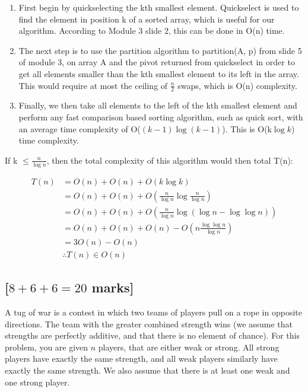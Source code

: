 \documentclass[12pt]{article}
\begin{document}
\begin{enumerate}
  \item First begin by quickselecting the kth smallest element. Quickselect is used to find the element in position k of a sorted array, which is useful for our algorithm. According to Module 3 slide 2, this can be done in O(n) time.
  \item The next step is to use the partition algorithm to partition(A, p) from slide 5 of module 3, on array A and the pivot returned from quickselect in order to get all elements smaller than the kth smallest element to its left in the array. This would require at most the ceiling of $\frac{n}{2}$ swaps, which is O(n) complexity.
  \item Finally, we then take all elements to the left of the kth smallest element and perform any fast comparison based sorting algorithm, such as quick sort, with an average time complexity of O($(k-1)\log (k-1)$). This is O(k$\log k$) time complexity.
\end{enumerate}

If k $\leq \frac{n}{\log n}$, then the total complexity of this algorithm would then total T(n):

\begin{align*}
  T(n)&= O(n) + O(n) + O(k\log k)\\
  &= O(n) + O(n) + O(\frac{n}{\log n}\log \frac{n}{\log n})\\
  &= O(n) + O(n) + O(\frac{n}{\log n}\log (\log n - \log \log n))\\
  &= O(n) + O(n) + O(n) - O(n\frac{\log \log n}{\log n})\\
  &= 3O(n) - O(n)\\
  &\therefore T(n) \in O(n)
\end{align*}

\subsection{[$8 + 6 + 6 = 20$ marks]}

A tug of war is a contest in which two teams of players pull on a rope in
opposite directions. The team with the greater combined strength wins (we
assume that strengths are perfectly additive, and that there is no element of
chance). For this problem, you are given $n$ players, that are either weak or
strong. All strong players have exactly the same strength, and all weak
players similarly have exactly the same strength. We also assume that there is
at least one weak and one strong player.
\end{document}
